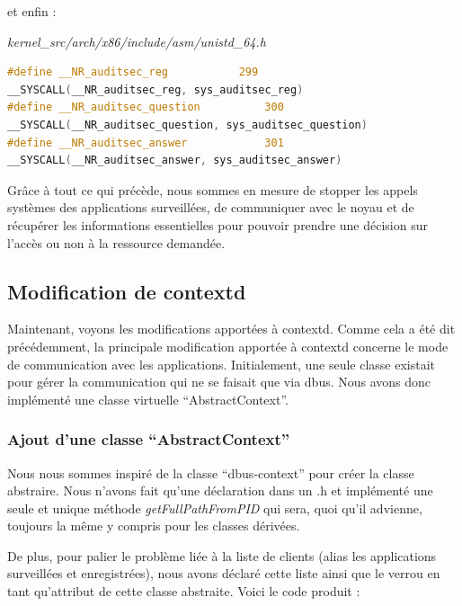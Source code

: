 \documentclass[pdftex,a4paper,titlepage,11pt]{article}
\begin{document}
et enfin :

\textit{{kernel\_src}/arch/x86/include/asm/unistd\_64.h}
\begin{lstlisting}[language=C]
#define __NR_auditsec_reg			299
__SYSCALL(__NR_auditsec_reg, sys_auditsec_reg)
#define __NR_auditsec_question			300
__SYSCALL(__NR_auditsec_question, sys_auditsec_question)
#define __NR_auditsec_answer			301
__SYSCALL(__NR_auditsec_answer, sys_auditsec_answer)
\end{lstlisting}


Grâce à tout ce qui précède, nous sommes en mesure de stopper les appels systèmes des applications surveillées, de communiquer avec le noyau et de récupérer les informations essentielles pour pouvoir prendre une décision sur l'accès ou non à la ressource demandée.

\subsection{Modification de contextd}

Maintenant, voyons les modifications apportées à contextd. Comme cela a été dit précédemment, la principale modification apportée à contextd concerne le mode de communication avec les applications. Initialement, une seule classe existait pour gérer la communication qui ne se faisait que via dbus. Nous avons donc implémenté une classe virtuelle ``AbstractContext''.

\subsubsection{Ajout d'une classe ``AbstractContext''}

Nous nous sommes inspiré de la classe ``dbus-context'' pour créer la classe abstraire. Nous n'avons fait qu'une déclaration dans un .h et implémenté une seule et unique méthode \textit{getFullPathFromPID} qui sera, quoi qu'il advienne, toujours la même y compris pour les classes dérivées.

De plus, pour palier le problème liée à la liste de clients (alias les applications surveillées et enregistrées), nous avons déclaré cette liste ainsi que le verrou en tant qu'attribut de cette classe abstraite. Voici le code produit :
\end{document}
